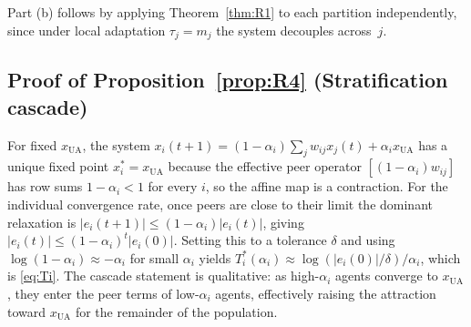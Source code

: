 \documentclass{article}
\theoremstyle{plain}
\theoremstyle{definition}
\theoremstyle{remark}
\newcommand{\xUA}{x_{\mathrm{UA}}}
\begin{document}
Part (b) follows by applying Theorem~\ref{thm:R1} to each partition
independently, since under local adaptation $\tau_j=m_j$ the system
decouples across~$j$.

\subsection{Proof of Proposition~\ref{prop:R4} (Stratification cascade)}

For fixed $\xUA$, the system
$x_i(t+1) = (1-\alpha_i)\sum_j w_{ij}x_j(t)+\alpha_i\xUA$
has a unique fixed point $x_i^*=\xUA$ because the effective peer
operator $[(1-\alpha_i)w_{ij}]$ has row sums $1-\alpha_i<1$ for every
$i$, so the affine map is a contraction.  For the individual
convergence rate, once peers are close to their limit the dominant
relaxation is
$|e_i(t+1)|\le (1-\alpha_i)|e_i(t)|$,
giving $|e_i(t)|\le (1-\alpha_i)^t|e_i(0)|$.  Setting this to a
tolerance $\delta$ and using $\log(1-\alpha_i)\approx -\alpha_i$ for
small $\alpha_i$ yields
$T_i^*(\alpha_i)\approx\log(|e_i(0)|/\delta)/\alpha_i$,
which is \eqref{eq:Ti}.  The cascade statement is qualitative: as
high-$\alpha_i$ agents converge to $\xUA$, they enter the peer terms
of low-$\alpha_i$ agents, effectively raising the attraction toward
$\xUA$ for the remainder of the population.
\end{document}

